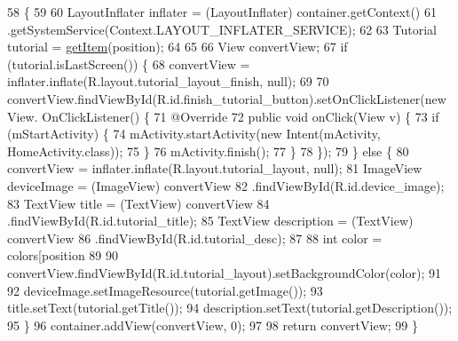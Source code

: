 \begin{DoxyCode}
58                                                                            \{
59 
60         LayoutInflater inflater = (LayoutInflater) container.getContext()
61                 .getSystemService(Context.LAYOUT\_INFLATER\_SERVICE);
62 
63         Tutorial tutorial = \hyperlink{classorg_1_1buildmlearn_1_1toolkit_1_1adapter_1_1TutorialAdapter_a2b57538f443c66c7a706128443693eda}{getItem}(position);
64 
65 
66         View convertView;
67         \textcolor{keywordflow}{if} (tutorial.isLastScreen()) \{
68             convertView = inflater.inflate(R.layout.tutorial\_layout\_finish, null);
69 
70             convertView.findViewById(R.id.finish\_tutorial\_button).setOnClickListener(\textcolor{keyword}{new} View.
      OnClickListener() \{
71                 @Override
72                 \textcolor{keyword}{public} \textcolor{keywordtype}{void} onClick(View v) \{
73                     \textcolor{keywordflow}{if} (mStartActivity) \{
74                         mActivity.startActivity(\textcolor{keyword}{new} Intent(mActivity, HomeActivity.class));
75                     \}
76                     mActivity.finish();
77                 \}
78             \});
79         \} \textcolor{keywordflow}{else} \{
80             convertView = inflater.inflate(R.layout.tutorial\_layout, null);
81             ImageView deviceImage = (ImageView) convertView
82                     .findViewById(R.id.device\_image);
83             TextView title = (TextView) convertView
84                     .findViewById(R.id.tutorial\_title);
85             TextView description = (TextView) convertView
86                     .findViewById(R.id.tutorial\_desc);
87 
88             \textcolor{keywordtype}{int} color = colors[position %
89 
90             convertView.findViewById(R.id.tutorial\_layout).setBackgroundColor(color);
91 
92             deviceImage.setImageResource(tutorial.getImage());
93             title.setText(tutorial.getTitle());
94             description.setText(tutorial.getDescription());
95         \}
96         container.addView(convertView, 0);
97 
98         \textcolor{keywordflow}{return} convertView;
99     \}
\end{DoxyCode}
